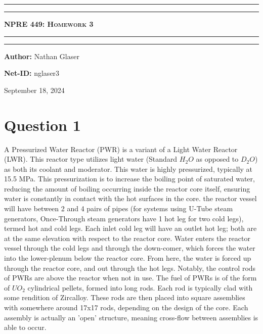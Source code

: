 \documentclass{article}
\begin{document}
\begin{titlepage}

\centering
\scshape
\vspace{\baselineskip}

%
\rule{\textwidth}{1.6pt}\vspace*{-\baselineskip}\vspace*{2pt}
\rule{\textwidth}{0.4pt}

{\Huge \textbf{\textsc{NPRE 449: Homework 3 \\
\vspace{15pt}}}}

\rule{\textwidth}{0.4pt}\vspace*{-\baselineskip}\vspace{3.2pt}
\rule{\textwidth}{1.6pt}\vspace{6pt}
\vspace{1.5\baselineskip}


\large \centerline{\textbf{Author:} Nathan Glaser}
\large \centerline{\textbf{Net-ID:} nglaser3}
\quad

\vfill
\large \centerline{September 18, 2024}
%
\end{titlepage}

\tableofcontents
\newpage
{}

\section*{Question 1}

A Pressurized Water Reactor (PWR) is a variant of a Light Water Reactor (LWR). This reactor type utilizes light water (Standard $H_2O$ as opposed to $D_2O$) as both its coolant and moderator. This water is highly pressurized, typically at 15.5 MPa. This pressurization is to increase the boiling point of saturated water, reducing the amount of boiling occurring inside the reactor core itself, ensuring water is constantly in contact with the hot surfaces in the core. the reactor vessel will have between 2 and 4 pairs of pipes (for systems using U-Tube steam generators, Once-Through steam generators have 1 hot leg for two cold legs), termed hot and cold legs. Each inlet cold leg will have an outlet hot leg; both are at the same elevation with respect to the reactor core. Water enters the reactor vessel through the cold legs and through the down-comer, which forces the water into the lower-plenum below the reactor core. From here, the water is forced up through the reactor core, and out through the hot legs. Notably, the control rods of PWRs are above the reactor when not in use. The fuel of PWRs is of the form of $UO_2$ cylindrical pellets, formed into long rods. Each rod is typically clad with some rendition of Zircalloy. These rods are then placed into square assemblies with somewhere around 17x17 rods, depending on the design of the core. Each assembly is actually an 'open' structure, meaning cross-flow between assemblies is able to occur. 
\end{document}
